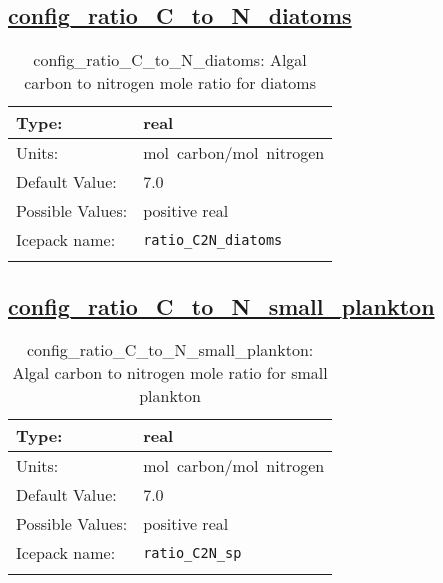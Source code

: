 \subsection[config\_ratio\_C\_to\_N\_diatoms]{\hyperref[sec:nm_tab_biogeochemistry]{config\_ratio\_C\_to\_N\_diatoms}}
\label{subsec:nm_sec_config_ratio_C_to_N_diatoms}
\begin{center}
\begin{longtable}{| p{2.0in} || p{4.0in} |}
    \hline
    Type: & real \\
    \hline
    Units: & \si{mol.carbon/mol.nitrogen} \\
    \hline
    Default Value: & 7.0 \\
    \hline
    Possible Values: & positive real \\
    \hline
    Icepack name: & \verb+ratio_C2N_diatoms+ \\
    \hline
    \caption{config\_ratio\_C\_to\_N\_diatoms: Algal carbon to nitrogen mole ratio for diatoms}
\end{longtable}
\end{center}
\subsection[config\_ratio\_C\_to\_N\_small\_plankton]{\hyperref[sec:nm_tab_biogeochemistry]{config\_ratio\_C\_to\_N\_small\_plankton}}
\label{subsec:nm_sec_config_ratio_C_to_N_small_plankton}
\begin{center}
\begin{longtable}{| p{2.0in} || p{4.0in} |}
    \hline
    Type: & real \\
    \hline
    Units: & \si{mol.carbon/mol.nitrogen} \\
    \hline
    Default Value: & 7.0 \\
    \hline
    Possible Values: & positive real \\
    \hline
    Icepack name: & \verb+ratio_C2N_sp+ \\
    \hline
    \caption{config\_ratio\_C\_to\_N\_small\_plankton: Algal carbon to nitrogen mole ratio for small plankton}
\end{longtable}
\end{center}
